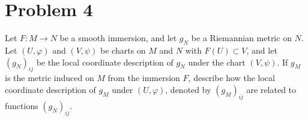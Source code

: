 \documentclass[a4paper]{article}
\begin{document}
\section*{Problem 4}%
Let $F: M \rightarrow N$ be a smooth immersion, and let $g_N$ be a Riemannian metric on $N$. Let $(U, \varphi)$ and $(V, \psi)$ be charts on $M$ and $N$ with $F(U) \subset V$, and let $(g_N)_{ij}$ be the local coordinate description of $g_N$ under the chart $(V, \psi)$. If $g_M$ is the metric induced on $M$ from the immersion $F$, describe how the local coordinate description of $g_M$ under $(U, \varphi)$, denoted by $(g_M)_{ij}$ are related to functions $(g_N)_{ij}$.
\end{document}
